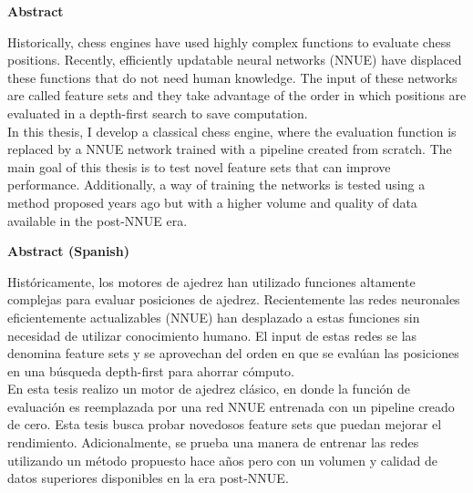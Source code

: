 \thispagestyle{plain}
\begin{center}
\large
\textbf{Abstract}
\end{center}

\begin{center}
\parbox{15cm}{
Historically, chess engines have used highly complex functions to evaluate chess positions. Recently, efficiently updatable neural networks (NNUE) have displaced these functions that do not need human knowledge. The input of these networks are called feature sets and they take advantage of the order in which positions are evaluated in a depth-first search to save computation. \\

In this thesis, I develop a classical chess engine, where the evaluation function is replaced by a NNUE network trained with a pipeline created from scratch. The main goal of this thesis is to test novel feature sets that can improve performance. Additionally, a way of training the networks is tested using a method proposed years ago but with a higher volume and quality of data available in the post-NNUE era.
}
\end{center}

\vspace{1cm}

\begin{center}
\large
\textbf{Abstract (Spanish)}
\end{center}

\begin{center}
\parbox{15cm}{
Históricamente, los motores de ajedrez han utilizado funciones altamente complejas para evaluar posiciones de ajedrez. Recientemente las redes neuronales eficientemente actualizables (NNUE) han desplazado a estas funciones sin necesidad de utilizar conocimiento humano. El input de estas redes se las denomina feature sets y se aprovechan del orden en que se evalúan las posiciones en una búsqueda depth-first para ahorrar cómputo. \\

En esta tesis realizo un motor de ajedrez clásico, en donde la función de evaluación es reemplazada por una red NNUE entrenada con un pipeline creado de cero. Esta tesis busca probar novedosos feature sets que puedan mejorar el rendimiento. Adicionalmente, se prueba una manera de entrenar las redes utilizando un método propuesto hace años pero con un volumen y calidad de datos superiores disponibles en la era post-NNUE.
}
\end{center}

\clearpage
